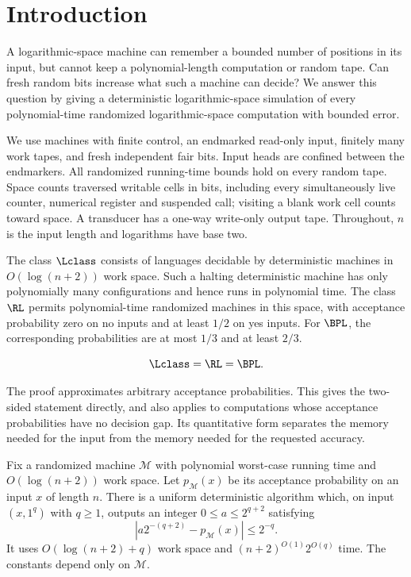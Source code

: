 \section{Introduction}\label{sec:intro}

A logarithmic-space machine can remember a bounded number of positions
in its input, but cannot keep a polynomial-length computation or random
tape. Can fresh random bits increase what such a machine can decide?
We answer this question by giving a deterministic logarithmic-space
simulation of every polynomial-time randomized logarithmic-space
computation with bounded error.

We use machines with finite control, an endmarked read-only input,
finitely many work tapes, and fresh independent fair bits. Input heads
are confined between the endmarkers. All randomized running-time
bounds hold on every random tape. Space counts traversed writable cells
in bits, including every simultaneously live counter, numerical register
and suspended call; visiting a blank work cell counts toward space.
A transducer has a one-way write-only output tape. Throughout,
$n$ is the input length and logarithms have base two.

The class $\Lclass$ consists of languages decidable by deterministic
machines in $O(\log(n+2))$ work space. Such a halting deterministic
machine has only polynomially many configurations and hence runs in
polynomial time. The class $\RL$ permits
polynomial-time randomized machines in this space, with acceptance
probability zero on no inputs and at least $1/2$ on yes inputs.
For $\BPL$, the corresponding probabilities are at most $1/3$ and at
least $2/3$.

\begin{theorem}\label{thm:main}
\[
                 \Lclass=\RL=\BPL.
\]
\end{theorem}

The proof approximates arbitrary acceptance probabilities. This gives
the two-sided statement directly, and also applies to computations
whose acceptance probabilities have no decision gap. Its quantitative
form separates the memory needed for the input from the memory needed
for the requested accuracy.

\begin{theorem}\label{thm:probability}
Fix a randomized machine $\mathcal M$ with polynomial worst-case
running time and $O(\log(n+2))$ work space. Let $p_{\mathcal M}(x)$ be
its acceptance probability on an input $x$ of length $n$. There is a
uniform deterministic algorithm which, on input $(x,1^q)$ with $q\ge1$,
outputs an integer $0\le a\le2^{q+2}$ satisfying
\[
       \left|a2^{-(q+2)}-p_{\mathcal M}(x)\right|\le2^{-q}.
\]
It uses $O(\log(n+2)+q)$ work space and
$(n+2)^{O(1)}2^{O(q)}$ time. The constants depend only on $\mathcal M$.
\end{theorem}

